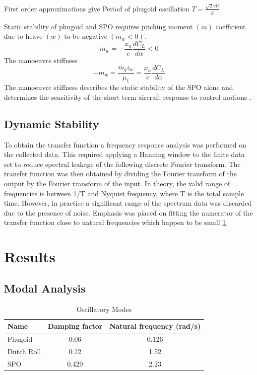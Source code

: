 \documentclass{article}
\begin{document}
First order approximations give
Period of phugoid oscillation $T = \frac{\sqrt{2} \pi U}{g}$

Static stability of phugoid and SPO requires pitching moment $(m)$ coefficient due to heave $(w)$ to be negative $(m_w < 0)$.
\begin{equation}
    m_w = -\frac{x_n}{c}\frac{dC_L}{d\alpha} < 0
\end{equation}
The manoeuvre stiffness
\begin{equation}
    -m_w = \frac{m_q z_w}{\mu_1} = \frac{x_n}{c}\frac{dC_L}{d\alpha} 
\end{equation}
The manoeuvre stiffness describes the static stability of the SPO alone and determines the sensitivity of the short term aircraft response to control motions \cite{handout}.



\subsection{Dynamic Stability}


To obtain the transfer function a frequency response analysis was performed on the collected data.
This required applying a Hanning window to the finite data set to reduce spectral leakage of the following discrete Fourier transform.
The transfer function was then obtained by dividing the Fourier transform of the output by the Fourier transform of the input.
In theory, the valid range of frequencies is between 1/T and Nyquist frequency, where T is the total sample time.
However, in practice a significant range of the spectrum data was discarded due to the presence of noise.
Emphasis was placed on fitting the numerator of the transfer function close to natural frequencies which happen to be small \ref{tab:oscillatory_modes}.

\section{Results}

\subsection{Modal Analysis}


\begin{table}[H]
  \centering
  \begin{tabular}{lcc}
      \toprule
      Name & Damping factor & Natural frequency (rad/s) \\
      \midrule
      Phugoid & 0.06 & 0.126 \\
      Dutch Roll & 0.12 & 1.52 \\
      SPO & 0.429 & 2.23 \\
      \bottomrule
  \end{tabular}
  \caption{Oscillatory Modes}
    \label{tab:oscillatory_modes}
\end{table}
\end{document}
